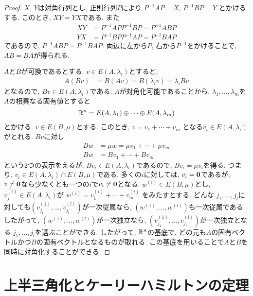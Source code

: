 \begin{proof}
$X$, $Y$は対角行列とし,
正則行列$P$により
$P^{-1}AP=X$, $P^{-1}BP=Y$
とかけるする.
このとき,
$XY=YX$である.
また
\begin{align*}
XY&=P^{-1}APP^{-1}BP=P^{-1}ABP\\
YX&=P^{-1}BPP^{-1}AP=P^{-1}BAP
\end{align*}
であるので, $P^{-1}ABP=P^{-1}BAP$.
両辺に左から$P$, 右から$P^{-1}$をかけることで,
$AB=BA$が得られる.

$A$と$B$が可換であるとする.
$v\in E(A,\lambda_i)$とすると,
\begin{align*}
A(Bv)&=B(Av)=B(\lambda_i v)=\lambda_i Bv
\end{align*}
となるので, $Bv\in E(A,\lambda_i)$である.
$A$が対角化可能であることから,
$\lambda_1,\ldots,\lambda_m$を$A$の相異なる固有値とすると
\begin{align*}
\mathbb{R}^n=E(A,\lambda_1)\oplus\cdots\oplus E(A,\lambda_m)
\end{align*}
とかける.
$v\in E(B,\mu)$とする.
このとき,
$v=v_1+\cdots+v_m$
となる$v_i\in E(A,\lambda_i)$がとれる.
$Bv$に対し
\begin{align*}
Bw&=\mu w=\mu v_1+\cdots+\mu v_m\\
Bw&=B v_1+\cdots+B v_m
\end{align*}
という2つの表示をえるが,
$Bv_i\in E(A,\lambda_i)$であるので,
$Bv_i=\mu v_i$を得る.
つまり, $v_i \in E(A,\lambda_i)\cap E(B,\mu)$である.
多くの$i$に対しては, $v_i=\boldsymbol{0}$であるが,
$v\neq \boldsymbol{0}$なら少なくとも一つの$i$で$v_i\neq \boldsymbol{0}$となる.
$w^{(i)}\in E(B,\mu)$とし,
$v^{(i)}_j\in E(A,\lambda_i)$が
$w^{(i)}=v^{(i)}_{1}+\cdots+v^{(i)}_m$
をみたすとする.
どんな
$j_1,\ldots,j_l$に対しても$(v^{(1)}_{j_1},\ldots, v^{(l)}_{j_l})$が一次従属なら,
$(w^{(1)},\ldots, w^{(l)})$も一次従属である.
したがって,
$(w^{(1)},\ldots, w^{(l)})$が一次独立なら,
$(v^{(1)}_{j_1},\ldots, v^{(l)}_{j_l})$が一次独立となる
$j_1,\ldots,j_l$を選ぶことができる.
したがって,
$\mathbb{R}^n$の基底で,
どの元も$A$の固有ベクトルかつ$B$の固有ベクトルとなるものが取れる.
この基底を用いることで$A$と$B$を同時に対角化することができる.
\end{proof}

\begin{quiz}
\end{quiz}

\chapter{上半三角化とケーリーハミルトンの定理}

